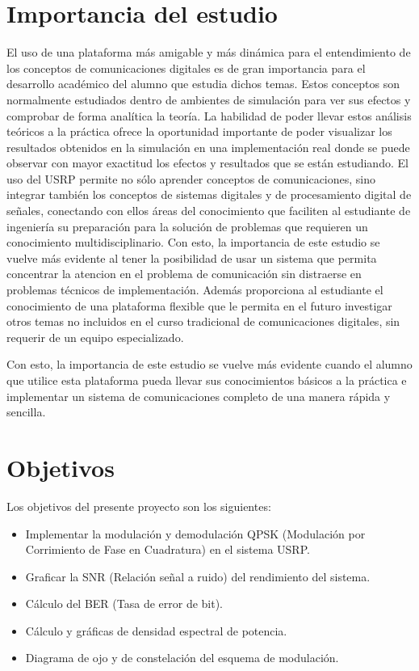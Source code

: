 \section{Importancia del estudio}

El uso de una plataforma m\'as amigable y m\'as din\'amica para el entendimiento de los conceptos de comunicaciones
digitales es de gran importancia para el desarrollo acad\'emico del alumno que estudia dichos temas. Estos conceptos son
normalmente estudiados dentro de ambientes de simulaci\'on para ver sus efectos y comprobar de forma anal\'itica la
teor\'ia. La habilidad de poder llevar estos an\'alisis te\'oricos a la pr\'actica ofrece la oportunidad importante de
poder visualizar los resultados obtenidos en la simulaci\'on en una implementaci\'on real donde se puede observar con mayor
exactitud los efectos y resultados que se est\'an estudiando. El uso del USRP permite no s\'olo aprender conceptos de
comunicaciones, sino integrar tambi\'en los conceptos de sistemas digitales y de procesamiento digital de se\~nales,
conectando con ellos \'areas del conocimiento que faciliten al estudiante de ingenier\'ia su preparaci\'on para la
soluci\'on de problemas que requieren un conocimiento multidisciplinario. Con esto, la importancia de este estudio se vuelve
m\'as evidente al tener la posibilidad de usar un sistema que permita concentrar la atencion en el problema de
comunicaci\'on sin distraerse en problemas t\'ecnicos de implementaci\'on. Adem\'as proporciona al estudiante el
conocimiento de una plataforma flexible que le permita en el futuro investigar otros temas no incluidos en el curso
tradicional de comunicaciones digitales, sin requerir de un equipo especializado.


Con esto, la importancia de este estudio se vuelve
m\'as evidente cuando el alumno que utilice esta plataforma pueda llevar sus conocimientos b\'asicos a la pr\'actica e implementar un sistema de comunicaciones completo de una manera r\'apida y
sencilla.

\section{Objetivos}

Los objetivos del presente proyecto son los siguientes:
\begin{itemize}
  \item Implementar la modulaci\'on y demodulaci\'on QPSK (Modulaci\'on por Corrimiento de Fase en Cuadratura) en el sistema
  USRP.
  \item Graficar la SNR (Relaci\'on se\~nal a ruido) del rendimiento del sistema.
  \item C\'alculo del BER (Tasa de error de bit).
  \item C\'alculo y gr\'aficas de densidad espectral de potencia.
  \item Diagrama de ojo y de constelaci\'on del esquema de modulaci\'on.
\end{itemize}

